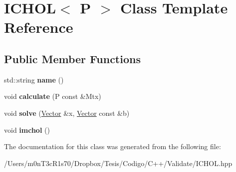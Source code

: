\hypertarget{class_i_c_h_o_l}{}\section{I\+C\+H\+OL$<$ P $>$ Class Template Reference}
\label{class_i_c_h_o_l}
\subsection*{Public Member Functions}
\begin{DoxyCompactItemize}
\item 
\hypertarget{class_i_c_h_o_l_a8ea7937f67b17ce80499721bbdb3b5ea}{}\label{class_i_c_h_o_l_a8ea7937f67b17ce80499721bbdb3b5ea} 
std\+::string {\bfseries name} ()
\item 
\hypertarget{class_i_c_h_o_l_a64da75f0f9b9a6acb66d5ee4d0d666e5}{}\label{class_i_c_h_o_l_a64da75f0f9b9a6acb66d5ee4d0d666e5} 
void {\bfseries calculate} (P const \&Mtx)
\item 
\hypertarget{class_i_c_h_o_l_a4fa1dcd6450eddc7d33ac88f8e7c2c13}{}\label{class_i_c_h_o_l_a4fa1dcd6450eddc7d33ac88f8e7c2c13} 
void {\bfseries solve} (\hyperlink{class_vector}{Vector} \&x, \hyperlink{class_vector}{Vector} const \&b)
\item 
\hypertarget{class_i_c_h_o_l_ab2aa38ed7de74a72a586ce43c1314510}{}\label{class_i_c_h_o_l_ab2aa38ed7de74a72a586ce43c1314510} 
void {\bfseries imchol} ()
\end{DoxyCompactItemize}


The documentation for this class was generated from the following file\+:\begin{DoxyCompactItemize}
\item 
/\+Users/m0n\+T3c\+R1s70/\+Dropbox/\+Tesis/\+Codigo/\+C++/\+Validate/I\+C\+H\+O\+L.\+hpp\end{DoxyCompactItemize}
